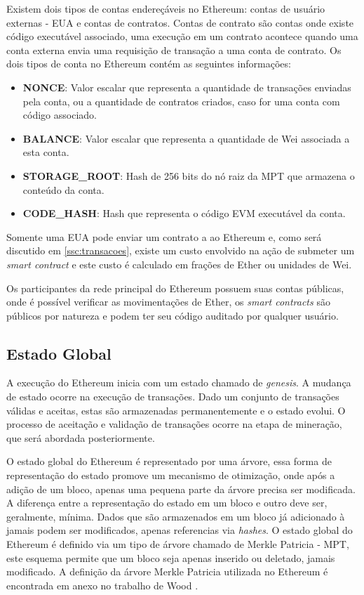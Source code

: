 \documentclass[tcc,capa]{texufpel}
\begin{document}
	Existem dois tipos de contas endereçáveis no Ethereum: contas de usuário externas - EUA e contas de contratos. Contas de contrato são contas onde existe código executável associado, uma execução em um contrato acontece quando uma conta externa envia uma requisição de transação a uma conta de contrato. Os dois tipos de conta no Ethereum contém as seguintes informações:
	
	\begin{itemize}
	    \item \textbf{NONCE}: Valor escalar que representa a quantidade de transações enviadas pela conta, ou a quantidade de contratos criados, caso for uma conta com código associado.
	    \item \textbf{BALANCE}: Valor escalar que representa a quantidade de Wei associada a esta conta.
	    \item \textbf{STORAGE\_ROOT}: Hash de 256 bits do nó raiz da MPT que armazena o conteúdo da conta. 
	    \item \textbf{CODE\_HASH}: Hash que representa o código EVM executável da conta.
	\end{itemize}
	
	Somente uma EUA pode enviar um contrato a ao Ethereum e, como será discutido em \ref{ssc:transacoes}, existe um custo envolvido na ação de submeter um \textit{smart contract} e este custo é calculado em frações de Ether ou unidades de Wei.
	
	Os participantes da rede principal do Ethereum possuem suas contas públicas, onde é possível verificar as movimentações de Ether, os \textit{smart contracts} são públicos por natureza e podem ter seu código auditado por qualquer usuário.

	
	\subsection{Estado Global}\label{ssc:estado-global}
	
	A execução do Ethereum inicia com um estado chamado de \textit{genesis}. A mudança de estado ocorre na execução de transações. Dado um conjunto de transações válidas e aceitas, estas são armazenadas permanentemente e o estado evolui. O processo de aceitação e validação de transações ocorre na etapa de mineração, que será abordada posteriormente.

	O estado global do Ethereum é representado por uma árvore, essa forma de representação do estado promove um mecanismo de otimização, onde após a adição de um bloco, apenas uma pequena parte da árvore precisa ser modificada. A diferença entre a representação do estado em um bloco e outro deve ser, geralmente, mínima. Dados que são armazenados em um bloco já adicionado à \bchain jamais podem ser modificados, apenas referencias via \textit{hashes}. O estado global do Ethereum é definido via um tipo de árvore chamado de Merkle Patricia - MPT, este esquema permite que um bloco seja apenas inserido ou deletado, jamais modificado. A definição da árvore Merkle Patricia utilizada no Ethereum é encontrada em anexo no trabalho de  Wood \cite{wood2014ethereum}.
	
\end{document}
